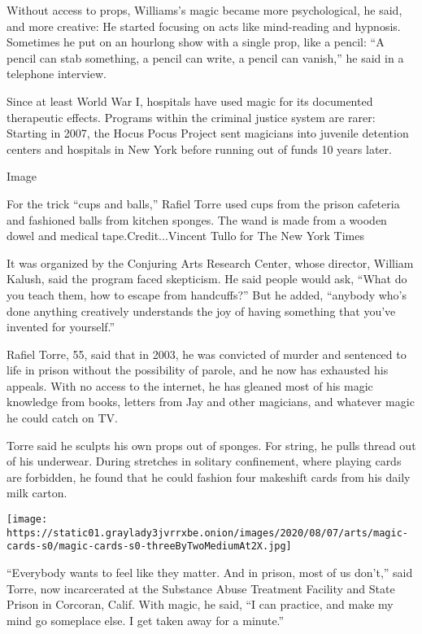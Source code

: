 Without access to props, Williams's magic became more psychological, he
said, and more creative: He started focusing on acts like mind-reading
and hypnosis. Sometimes he put on an hourlong show with a single prop,
like a pencil: ``A pencil can stab something, a pencil can write, a
pencil can vanish,'' he said in a telephone interview.

Since at least World War I, hospitals have used magic for its documented
therapeutic effects. Programs within the criminal justice system are
rarer: Starting in 2007, the Hocus Pocus Project sent magicians into
juvenile detention centers and hospitals in New York before running out
of funds 10 years later.

Image

For the trick ``cups and balls,'' Rafiel Torre used cups from the prison
cafeteria and fashioned balls from kitchen sponges. The wand is made
from a wooden dowel and medical tape.Credit...Vincent Tullo for The New
York Times

It was organized by the Conjuring Arts Research Center, whose director,
William Kalush, said the program faced skepticism. He said people would
ask, ``What do you teach them, how to escape from handcuffs?'' But he
added, ``anybody who's done anything creatively understands the joy of
having something that you've invented for yourself.''

Rafiel Torre, 55, said that in 2003, he was convicted of murder and
sentenced to life in prison without the possibility of parole, and he
now has exhausted his appeals. With no access to the internet, he has
gleaned most of his magic knowledge from books, letters from Jay and
other magicians, and whatever magic he could catch on TV.

Torre said he sculpts his own props out of sponges. For string, he pulls
thread out of his underwear. During stretches in solitary confinement,
where playing cards are forbidden, he found that he could fashion four
makeshift cards from his daily milk carton.

\texttt{[image: https://static01.graylady3jvrrxbe.onion/images/2020/08/07/arts/magic-cards-s0/magic-cards-s0-threeByTwoMediumAt2X.jpg]}

``Everybody wants to feel like they matter. And in prison, most of us
don't,'' said Torre, now incarcerated at the Substance Abuse Treatment
Facility and State Prison in Corcoran, Calif. With magic, he said, ``I
can practice, and make my mind go someplace else. I get taken away for a
minute.''

